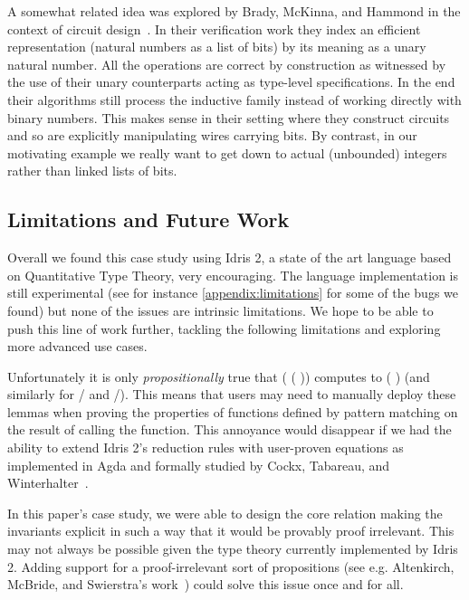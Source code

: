\documentclass{article}
\newcommand{\idris}{Idris 2}
\begin{document}
A somewhat related idea was explored by Brady, McKinna, and Hammond in the context of
circuit design~\cite{DBLP:conf/sfp/BradyMH07}. In their verification work they index
an efficient representation (natural numbers as a list of bits) by its meaning as a
unary natural number. All the operations are correct by construction as witnessed by
the use of their unary counterparts acting as type-level specifications.
%
In the end their algorithms still process the inductive family instead of working
directly with binary numbers. This makes sense in their setting where they construct
circuits and so are explicitly manipulating wires carrying bits.
%
By contrast, in our motivating example we really want to get down to actual (unbounded)
integers rather than linked lists of bits.


\subsection{Limitations and Future Work}

Overall we found this case study using \idris{}, a state of the art language
based on Quantitative Type Theory, very encouraging.
%
The language implementation is still experimental (see for instance
\cref{appendix:limitations} for some of the bugs we found) but none of
the issues are intrinsic limitations.
%
We hope to be able to push this line of work further, tackling the following
limitations and exploring more advanced use cases.

Unfortunately it is only \emph{propositionally} true that
( (  ))
computes to (  ) (and similarly for
/ and /).
%
This means that users may need to manually deploy these lemmas when proving the
properties of functions defined by pattern matching on the result of calling the
 function.
%
This annoyance would disappear if we had the ability to extend \idris{}'s reduction rules
with user-proven equations as implemented in Agda and formally studied
by Cockx, Tabareau, and Winterhalter~\cite{DBLP:journals/pacmpl/CockxTW21}.

In this paper's case study, we were able to design the core 
relation making the invariants explicit in such a way that it would be provably
proof irrelevant.
%
This may not always be possible given the type theory currently implemented by
\idris{}. Adding support for a proof-irrelevant sort of propositions (see e.g.
Altenkirch, McBride, and Swierstra's work~\cite{DBLP:conf/plpv/AltenkirchMS07})
could solve this issue once and for all.
\end{document}

